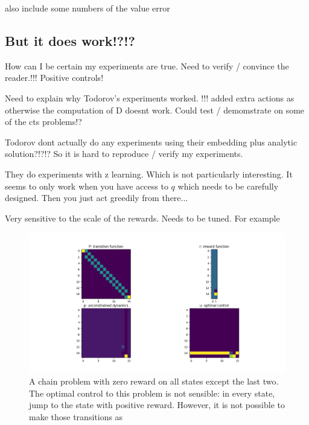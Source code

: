 {\color{red}also include some numbers of the value error}

\subsection{But it does work!?!?}

How can I be certain my experiments are true. Need to verify / convince the reader.!!!
Positive controls!

Need to explain why Todorov's experiments worked. !!!
added extra actions as otherwise the computation of D doesnt work.
Could test / demomstrate on some of the cts problems!?

Todorov dont actually do any experiments using their embedding plus analytic solution?!?!? So it is hard to reproduce / verify my experiments.

They do experiments with z learning. Which is not particularly interesting. It seems to only work when you have access to $q$ which needs to be carefully designed. Then you just act greedily from there...

Very sensitive to the scale of the rewards. Needs to be tuned. For example

\begin{figure}
\centering
\includegraphics[width=1\textwidth,height=0.35\textheight]{../../pictures/figures/chain-test-zero-rewards.png}
\caption{A chain problem with zero reward on all states except the last two.
The optimal control to this problem is not sensible: in every state, jump to the state with positive reward.
However, it is not possible to make those transitions as }
\end{figure}

